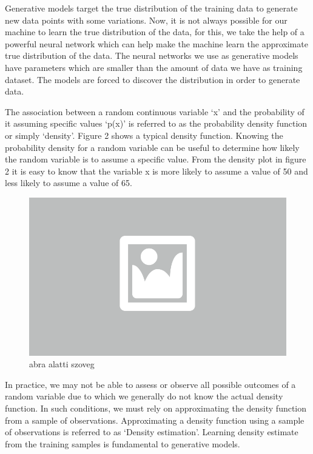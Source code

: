 Generative models target the true distribution of the training data to generate new data points with some variations. Now, it is not always possible for our machine to learn the true distribution of the data, for this, we take the help of a powerful neural network which can help make the machine learn the approximate true distribution of the data.
The neural networks we use as generative models have parameters which are smaller than the amount of data we have as training dataset. The models are forced to discover the distribution in order to generate data.


The association between a random continuous variable ‘x’ and the probability of it assuming specific values ‘p(x)’ is referred to as the probability density function or simply ‘density’. Figure 2 shows a typical density function. Knowing the probability density for a random variable can be useful to determine how likely the random variable is to assume a specific value. From the density plot in figure 2 it is easy to know that the variable x is more likely to assume a value of 50 and less likely to assume a value of 65.

\begin{figure}[ht]
	\centering
	\includegraphics[width=0.65\columnwidth]{figures/abra.png}
	\caption{abra alatti szoveg}
\end{figure}

In practice, we may not be able to assess or observe all possible outcomes of a random variable due to which we generally do not know the actual density function. In such conditions, we must rely on approximating the density function from a sample of observations. Approximating a density function using a sample of observations is referred to as ‘Density estimation’.  Learning density estimate from the training samples is fundamental to generative models.

